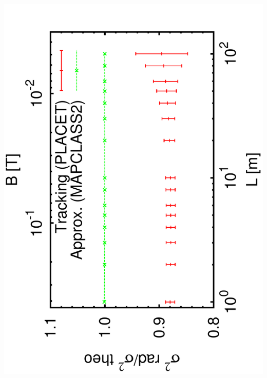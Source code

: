 \documentclass{beamer}
\begin{document}
\begin{frame}
  \includegraphics[scale=0.24,angle=-90]{sigma_Lbend.pdf}

\end{frame}
\end{document}
